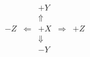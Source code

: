 \documentclass{article}
\begin{document}
\pagecolor{red!20}
\huge \bf
\[
\begin{array}{ccccc}
  && +Y && \\
  &&\Uparrow && \\
-Z & \Leftarrow & +X & \Rightarrow & +Z \\
  &&\Downarrow && \\
&& -Y && 
\end{array}
\]
\end{document}
